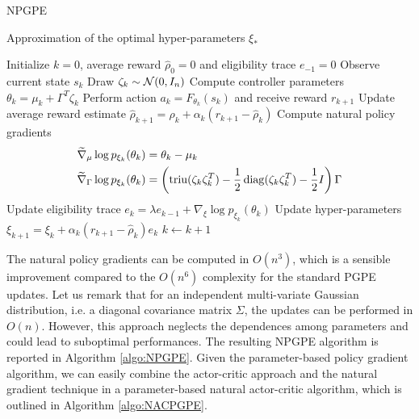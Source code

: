 \begin{algorithm}[t!]
	\caption{NPGPE}
	\label{algo:NPGPE}
	\begin{algorithmic}[0]
		\Ensure Approximation of the optimal hyper-parameters $\xi_*$
		\begin{algorithmic}[1]
		\State Initialize $k = 0$, average reward $\widehat{\rho}_0 = 0$ and eligibility trace $e_{-1} = 0$
		\Repeat
			\State Observe current state $s_k$
			\State Draw $\zeta_k \sim \mathcal{N}(0, I_n)$
			\State Compute controller parameters $\theta_k = \mu_k + \Gamma^T \zeta_k$
			\State Perform action $a_k = F_{\theta_k}(s_k)$ and receive reward $r_{k+1}$
			\State Update average reward estimate $\widehat{\rho}_{k+1} = \widehat{\rho}_{k} + \alpha_k (r_{k+1} - \widehat{\rho}_{k})$
			\State Compute natural policy gradients
				\begin{equation*}
					\begin{split}
						\widetilde{\nabla}_\mu \log p_{\xi_k}(\theta_k) &= \theta_k - \mu_k\\
						\widetilde{\nabla}_\Gamma \log p_{\xi_k}(\theta_k) &= \left(\operatorname{triu}(\zeta_k \zeta_k^T) - \frac{1}{2} \operatorname{diag}(\zeta_k \zeta_k^T) - \frac{1}{2} I \right) \Gamma
					\end{split}
				\end{equation*}
			\State Update eligibility trace $e_{k} = \lambda e_{k-1} + \nabla_\xi \log p_{\xi_k}(\theta_k)$
			\State Update hyper-parameters $\xi_{k+1} = \xi_k + \alpha_k (r_{k+1} - \widehat{\rho}_{k}) e_k$
			\State $k \leftarrow k + 1$
		\end{algorithmic}
	\end{algorithmic}
\end{algorithm}  
The natural policy gradients can be computed in $O(n^3)$, which is a sensible improvement compared to the $O(n^6)$ complexity for the standard PGPE updates. Let us remark that for an independent multi-variate Gaussian distribution, i.e. a diagonal covariance matrix $\Sigma$, the updates can be performed in $O(n)$. However, this approach neglects the dependences among parameters and could lead to suboptimal performances. The resulting NPGPE algorithm is reported in Algorithm \ref{algo:NPGPE}. Given the parameter-based policy gradient algorithm, we can easily combine the actor-critic approach and the natural gradient technique in a parameter-based natural actor-critic algorithm, which is outlined in Algorithm \ref{algo:NACPGPE}.
